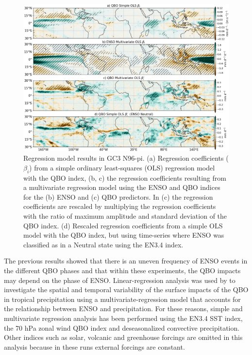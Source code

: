 \begin{figure}[b!]
\centering
 \noindent
 \includegraphics[width=\linewidth]{figures/regress_gc3.png}
\caption[Convective precipitation regression analysis]{Regression model results in GC3 N96-pi. (a) Regression coefficients ($\beta_i$) from a simple ordinary least-squares (OLS) regression model with the QBO index, (b, c) the regression coefficients resulting from a multivariate regression model using the ENSO and QBO indices for the (b) ENSO and (c) QBO predictors. In (c) the regression coefficients are rescaled by multiplying the regression coefficients with the ratio of maximum amplitude and standard deviation of the QBO index. (d) Rescaled regression coefficients from a simple OLS model with the QBO index, but using time-series where ENSO was classified as in a Neutral state using the EN3.4 index.  }
\label{fig:enso_regress}
\end{figure}


The previous results showed that there is an uneven frequency of ENSO events in the different QBO phases and that within these experiments, the QBO impacts may depend on the phase of ENSO. 
Linear-regression analysis was used by \cite{gray2018} to investigate the spatial and temporal variability of the surface impacts of the QBO in tropical precipitation using a multivariate-regression model that accounts for the relationship between ENSO and precipitation. 
For these reasons, simple and multivariate regression analysis has been performed using the EN3.4 SST index, the 70 hPa zonal wind QBO index and deseasonalized convective precipitation. Other indices such as solar, volcanic and greenhouse forcings are omitted in this analysis because in these runs external forcings are constant.

